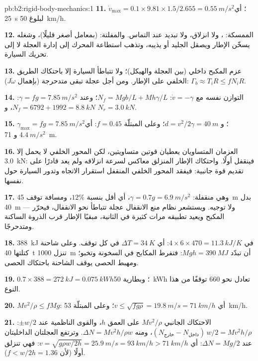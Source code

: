 \begin{solution}{pb:b2:rigid-body-mechanics:1}
\textbf{11.} $\dot v_{\max} = 0.1 \times 9.81 \times 1.5/2.655 = \qty{0.55}{m/s^2}$؛
أي \qty{25}{s} لبلوغ \qty{50}{km/h}.

\textbf{12.} الممسكة: ، ولا انزلاق، ولا تبديد عند
التماس. والمفلتة:  (بمعامل أصغر قليلًا)، وشغله يسخّن
الإطار ويصقل الجليد أو يذيبه، وتذهب استطاعة المحرك إلى إدارة
العجلة لا إلى تحريك السيارة.

\textbf{13.} عزم المكبح داخلي (بين العجلة والهيكل)؛ ولا تتباطأ
السيارة إلا باحتكاك الطريق الخلفي على الإطار. ومن أجل عجلة تبقى
متدحرجة (بإهمال $J\dot\omega$): $\Gamma_b \approx T_iR \le fN_iR$.

\textbf{14.} التوازن نفسه مع $\dot v = -\gamma$: $N_f = Mgb/L + Mh\gamma/L$؛
وعند $\gamma = fg = \qty{7.85}{m/s^2}$: $N_f = 6792 + 1992 = \qty{8.8}{kN}$، و $N_r =
\qty{3.0}{kN}$.

\textbf{15.} $\gamma_{\max} = fg = \qty{7.85}{m/s^2}$؛ و $d = v^2/2\gamma = \qty{40}{m}$؛
وعلى المبتلّة $f = 0.45$: أي $\qty{4.4}{m/s^2}$ و \qty{71}{m}.

\textbf{16.} العزمان المتساويان يعطيان قوتين متساويتين، لكن
المحور الخلفي لا يحمل إلا \qty{3.0}{kN}: فينقفل أولًا. واحتكاك
الإطار المنزلق معاكس لسرعة انزلاقه ولم يعد قادرًا على تقديم
قوة جانبية: فيفقد المحور الخلفي المنقفل استقرار الاتجاه وتدور السيارة حول نفسها.

\textbf{17.} وهي منقفلة: $\gamma = 0.7g = \qty{6.9}{m/s^2}$، أي أقل بنسبة $12\%$،
ومسافة توقف \qty{45}{m} بدل \qty{40}{m} --- ولا توجيه. ويستشعر نظام
منع الانقفال عجلة تتباطأ نحو الانقفال، فيحرّر المكبح ويعيد
تطبيقه مرات كثيرة في الثانية، مبقيًا الإطار قرب الذروة
الساكنة ومتدحرجًا.

\textbf{18.} \qty{388}{kJ} في $4 \times 6 \times 470 = \qty{11.3}{kJ/K}$: أي $\Delta T =
\qty{34}{K}$ في كل توقف. وعلى شاحنة كتلتها \qty{40}{t} تنزل \qty{1000}{m} أن تبدّد
$Mgh = \qty{390}{MJ}$: فتفرط المكابح في السخونة وتخبو؛ ومهبط الحصى يوقف
الشاحنة باحتكاك الحصى.

\textbf{19.} $0.7 \times 388 = \qty{272}{kJ} = \qty{0.075}{kWh}$؛ وبطارية \qty{50}{kWh}
تعادل نحو $660$ توقفًا من هذا النوع.

\textbf{20.} $Mv^2/\rho \le fMg$: أي $v \le \sqrt{fg\rho} = \qty{19.8}{m/s} =
\qty{71}{km/h}$؛ وعلى المبتلّة \qty{53}{km/h}.

\textbf{21.} الاحتكاك الجانبي $Mv^2/\rho$ على العمق $h$، والقوى الناظمية عند
$\pm w/2$: $(N_{\text{خارج}} - N_{\text{داخل}})\,w/2 = Mv^2h/\rho$، ومنه $\Delta N =
Mv^2h/\rho w$. وترتفع العجلتان الداخليتان عند $\Delta N = Mg/2$: أي $v = \sqrt{g\rho w/2h} =
\qty{25.9}{m/s} = \qty{93}{km/h} > \qty{71}{km/h}$: فهي تنزلق أولًا (لأن $f <
w/2h = 1.36$).


\end{solution}
